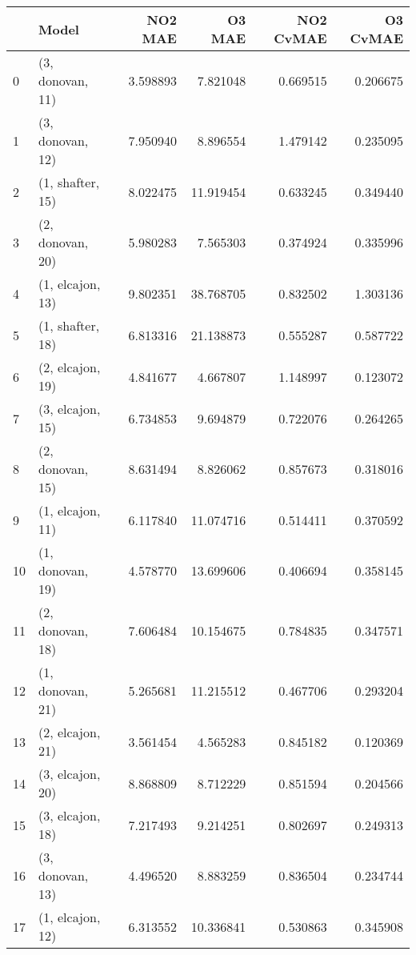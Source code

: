 \begin{tabular}{llrrrr}
\toprule
{} &             Model &   NO2 MAE &     O3 MAE &  NO2 CvMAE &  O3 CvMAE \\
\midrule
0  &  (3, donovan, 11) &  3.598893 &   7.821048 &   0.669515 &  0.206675 \\
1  &  (3, donovan, 12) &  7.950940 &   8.896554 &   1.479142 &  0.235095 \\
2  &  (1, shafter, 15) &  8.022475 &  11.919454 &   0.633245 &  0.349440 \\
3  &  (2, donovan, 20) &  5.980283 &   7.565303 &   0.374924 &  0.335996 \\
4  &  (1, elcajon, 13) &  9.802351 &  38.768705 &   0.832502 &  1.303136 \\
5  &  (1, shafter, 18) &  6.813316 &  21.138873 &   0.555287 &  0.587722 \\
6  &  (2, elcajon, 19) &  4.841677 &   4.667807 &   1.148997 &  0.123072 \\
7  &  (3, elcajon, 15) &  6.734853 &   9.694879 &   0.722076 &  0.264265 \\
8  &  (2, donovan, 15) &  8.631494 &   8.826062 &   0.857673 &  0.318016 \\
9  &  (1, elcajon, 11) &  6.117840 &  11.074716 &   0.514411 &  0.370592 \\
10 &  (1, donovan, 19) &  4.578770 &  13.699606 &   0.406694 &  0.358145 \\
11 &  (2, donovan, 18) &  7.606484 &  10.154675 &   0.784835 &  0.347571 \\
12 &  (1, donovan, 21) &  5.265681 &  11.215512 &   0.467706 &  0.293204 \\
13 &  (2, elcajon, 21) &  3.561454 &   4.565283 &   0.845182 &  0.120369 \\
14 &  (3, elcajon, 20) &  8.868809 &   8.712229 &   0.851594 &  0.204566 \\
15 &  (3, elcajon, 18) &  7.217493 &   9.214251 &   0.802697 &  0.249313 \\
16 &  (3, donovan, 13) &  4.496520 &   8.883259 &   0.836504 &  0.234744 \\
17 &  (1, elcajon, 12) &  6.313552 &  10.336841 &   0.530863 &  0.345908 \\
\bottomrule
\end{tabular}
